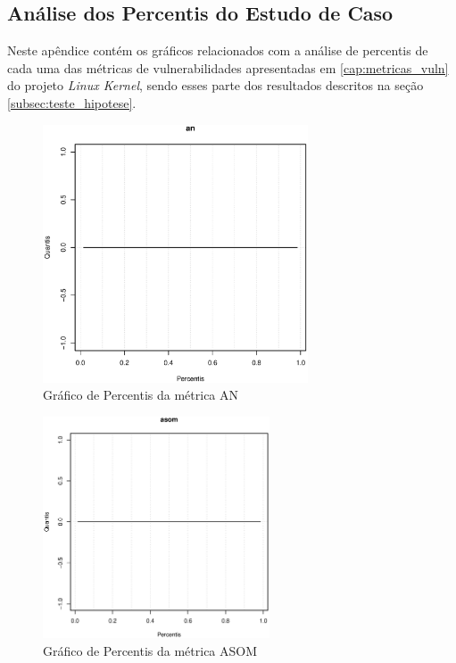 \begin{apendicesenv}

\partapendices

\chapter{Análise dos Percentis do Estudo de Caso} \label{anex:percentis}

Neste apêndice contém os gráficos relacionados com a análise de percentis de cada
uma das métricas de vulnerabilidades apresentadas em \ref{cap:metricas_vuln}
do
projeto \emph{Linux Kernel}, sendo esses parte dos resultados descritos na seção
\ref{subsec:teste_hipotese}.


\begin{figure}[h]
  \centering
  \includegraphics[width=0.7\textwidth]
      {dados/linux/an.eps}
  \caption{Gráfico de Percentis da métrica AN}
\end{figure}

\newpage

\begin{figure}[h]
  \centering
  \includegraphics[width=0.6\textwidth]
      {dados/linux/asom.eps}
  \caption{Gráfico de Percentis da métrica ASOM}
  \label{graphic:asom}
\end{figure}


\end{apendicesenv}
